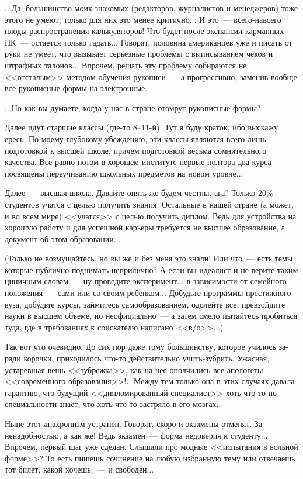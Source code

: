 \documentclass{scrbook}
\newcommand{\flqq}{<<}
\newcommand{\frqq}{>>}
\newcommand{\mdash}{~--- }
\newcommand{\ndash}{--}
\newcommand{\commamdash}{~--- } %
\begin{document}
...Да, большинство моих знакомых (редакторов, журналистов и менеджеров) тоже этого не умеют, только для них это менее критично... И это{\mdash}всего-навсего плоды распространения калькуляторов! Что будет после экспансии карманных ПК{\mdash}остается только гадать... Говорят, половина американцев уже и писать от руки не умеет, что вызывает серьезные проблемы с выписыванием чеков и штрафных талонов... Впрочем, решать эту проблему собираются не {\flqq}отсталым{\frqq} методом обучения рукописи{\mdash}а прогрессивно, заменив вообще все рукописные формы на электронные.

...Но как вы думаете, когда у нас в стране отомрут рукописные формы?

Далее идут старшие классы (где-то 8{\ndash}11-й). Тут я буду краток, ибо выскажу ересь. По моему глубокому убеждению, эти классы являются всего лишь подготовкой к высшей школе, причем подготовкой весьма сомнительного качества. Все равно потом в хорошем институте первые полтора-два курса посвящены переучиванию школьных предметов на новом уровне...

Далее{\mdash}высшая школа. Давайте опять же будем честны, ага? Только 20\% студентов учатся с целью получить знания. Остальные в нашей стране (а может, и во всем мире) {\flqq}учатся{\frqq} с целью получить диплом. Ведь для устройства на хорошую работу и для успешной карьеры требуется не высшее образование, а документ об этом образовании...

(Только не возмущайтесь, но вы же и без меня это знали! Или что{\mdash}есть темы, которые публично поднимать неприлично? А если вы идеалист и не верите таким циничным словам{\mdash}ну проведите эксперимент... в зависимости от семейного положения{\mdash}сами или со своим ребенком... Добудьте программы престижного вуза, добудьте курсы, займитесь самообразованием, одолейте все, превзойдите науки в высшем объеме, но неофициально{\mdash}а затем смело пытайтесь пробиться туда, где в требованиях к соискателю написано {\flqq}в/о{\frqq}...)

Так вот что очевидно. До сих пор даже тому большинству, которое училось за-ради корочки, приходилось что-то действительно учить-зубрить. Ужасная, устаревшая вещь {\flqq}зубрежка{\frqq}, как на нее ополчились все апологеты {\flqq}современного образования{\frqq}!.. Между тем только она в этих случаях давала гарантию, что будущий {\flqq}дипломированный специалист{\frqq} хоть что-то по специальности знает, что хоть что-то застряло в его мозгах...

Ныне этот анахронизм устранен. Говорят, скоро и экзамены отменят. За ненадобностью, а как же! Ведь экзамен{\mdash}форма недоверия к студенту... Впрочем, первый шаг уже сделан. Слышали про модные {\flqq}испытания в вольной форме{\frqq}? То есть пишешь сочинение на любую избранную тему или отвечаешь тот билет, какой хочешь,{\commamdash} и свободен...
\end{document}
